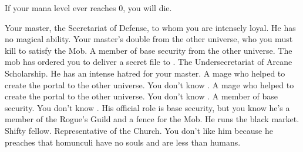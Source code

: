 \documentclass[char]{guildcamp3}
\begin{document}
\begin{itemz}[Notes]
  \item If your mana level ever reaches 0, you will die.
\end{itemz}


\begin{contacts}
  \contact{\cNobleOne{}} Your master, the Secretariat of Defense, to whom you are intensely loyal. He has no magical ability.
  \contact{\cPoliOne{}} Your master's double from the other universe, who you must kill to satisfy the Mob.
  \contact{\cSpecOpTwo{}} A member of base security from the other universe. The mob has ordered you to deliver a secret file to \cSpecOpTwo{\them}. 
  \contact{\cNobleTwo{}} The Undersecretariat of Arcane Scholarship. He has an intense hatred for your master.
  \contact{\cMageOne{}} A mage who helped to create the portal to the other universe. You don't know \cMageOne{\them}.
  \contact{\cMageTwo{}} A mage who helped to create the portal to the other universe. You don't know \cMageTwo{\them}.
  \contact{\cRogueOne{}} A member of base security. You don't know \cRogueOne{\them}.
  \contact{\cRogueTwo{}} His official role is base security, but you know he's a member of the Rogue's Guild and a fence for the Mob. He runs the black market. Shifty fellow.
  \contact{\cPaladin} Representative of the Church. You don't like him because he preaches that homunculi have no souls and are less than humans.
\end{contacts}
\end{document}
